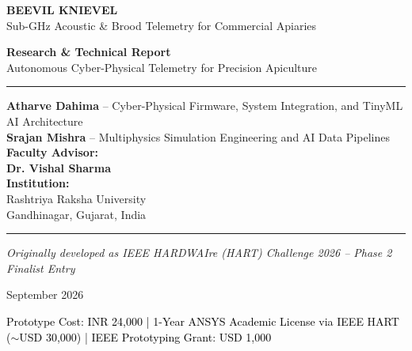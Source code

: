 \documentclass[12pt,a4paper]{article}
\begin{document}
\begin{titlepage}
\begin{center}

\vspace*{1.5cm}

{\Huge\bfseries\textcolor{deepSlate}{BEEVIL KNIEVEL}}\\[0.6cm]
{\Large\textcolor{beeGold}{Sub-GHz Acoustic \& Brood Telemetry for Commercial Apiaries}}

\vspace{1.5cm}

{\large\textbf{Research \& Technical Report}\\[0.2cm]
\textcolor{techBlue}{Autonomous Cyber-Physical Telemetry for Precision Apiculture}}

\vspace{1.2cm}

\rule{0.6\textwidth}{0.5pt}

\vspace{0.8cm}

{\large
\textbf{Atharve Dahima} -- Cyber-Physical Firmware, System Integration, and TinyML AI Architecture\\[0.2cm]
\textbf{Srajan Mishra} -- Multiphysics Simulation Engineering and AI Data Pipelines\\[0.5cm]
\textbf{Faculty Advisor:}\\[0.15cm]
\textbf{Dr. Vishal Sharma}\\[0.5cm]
\textbf{Institution:}\\[0.15cm]
Rashtriya Raksha University\\
Gandhinagar, Gujarat, India
}

\vspace{1.0cm}

\rule{0.6\textwidth}{0.5pt}

\vspace{0.6cm}

{\small\textit{Originally developed as IEEE HARDWAIre (HART) Challenge 2026 -- Phase 2 Finalist Entry}}

\vspace{0.4cm}

{\small September 2026}

\vspace{0.5cm}

{\footnotesize\textcolor{black}{Prototype Cost: INR 24,000 | 1-Year ANSYS Academic License via IEEE HART ($\sim$USD 30,000) | IEEE Prototyping Grant: USD 1,000}}

\end{center}
\end{titlepage}
\end{document}
